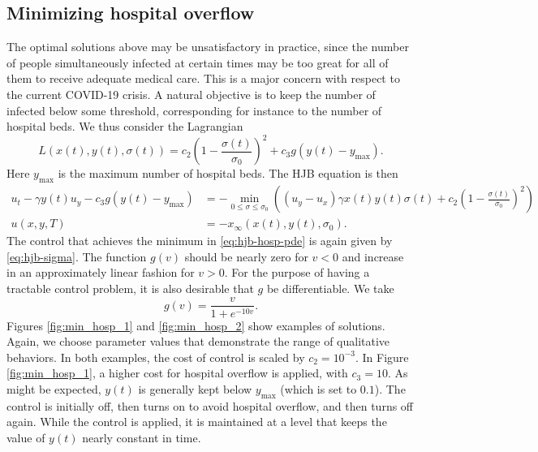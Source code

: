 \documentclass[english,12pt,letter]{article}
\newcommand{\Rnot}{\sigma_0}
\newcommand{\Sinf}{x_\infty}
\newcommand{\ymax}{y_\text{max}}
\begin{document}
\subsection{Minimizing hospital overflow}
The optimal solutions above may be unsatisfactory in practice,
since the number of people simultaneously infected at certain times
may be too great for all of them to receive adequate medical care.  This is a major concern
with respect to the current COVID-19 crisis.  A natural objective is to keep
the number of infected below some threshold, corresponding for instance to the
number of hospital beds.  We thus consider the Lagrangian
$$
    L(x(t),y(t),\sigma(t)) = c_2 \left(1-\frac{\sigma(t)}{\Rnot}\right)^2 + c_3 g(y(t)-y_\text{max}).
$$
Here $\ymax$ is the maximum number of hospital beds.
The HJB equation is then
\begin{subequations} \label{eq:hjb-hosp}
\begin{align} \label{eq:hjb-hosp-pde}
    u_t - \gamma y(t) u_y - c_3 g(y(t)-y_\text{max}) & = - \min_{0\le \sigma\le \Rnot} \left((u_y-u_x)\gamma x(t) y(t) \sigma(t) + c_2 \left(1-\frac{\sigma(t)}{\Rnot}\right)^2 \right) \\
    u(x,y,T) & = -\Sinf(x(t),y(t),\Rnot).
\end{align}
\end{subequations}
The control that achieves the minimum in \eqref{eq:hjb-hosp-pde} is again given by \eqref{eq:hjb-sigma}.
The function $g(v)$ should be nearly zero for $v<0$ and increase
in an approximately linear fashion for $v>0$.  For the purpose of having
a tractable control problem, it is also desirable that $g$ be differentiable.
We take
$$
g(v) = \frac{v}{1+e^{-10v}}.
$$
Figures \ref{fig:min_hosp_1} and \ref{fig:min_hosp_2} show examples of solutions.
Again, we choose parameter values that demonstrate the range of qualitative behaviors.
In both examples, the cost of control is scaled by $c_2=10^{-3}$.
In Figure \ref{fig:min_hosp_1}, a higher cost for hospital overflow is applied,
with $c_3=10$.  As might be expected, $y(t)$ is generally
kept below $\ymax$ (which is set to $0.1$).
The control is initially off, then turns on
to avoid hospital overflow, and then turns off again.  While the control is applied,
it is maintained at a level that keeps the value of $y(t)$ nearly constant in time.
\end{document}
